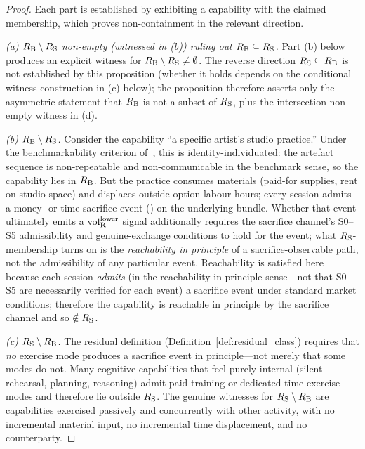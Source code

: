 \begin{proof}
Each part is established by exhibiting a capability with the
claimed membership, which proves non-containment in the relevant
direction.

\emph{(a) $R_{\mathrm{B}} \setminus R_{\mathrm{S}}$ non-empty (witnessed in (b))
ruling out $R_{\mathrm{B}} \subseteq R_{\mathrm{S}}$.}
Part (b) below produces an explicit witness for
$R_{\mathrm{B}} \setminus R_{\mathrm{S}} \neq \emptyset$.  The reverse
direction $R_{\mathrm{S}} \subseteq R_{\mathrm{B}}$ is not established by this
proposition (whether it holds depends on the conditional
witness construction in (c) below); the proposition therefore
asserts only the asymmetric statement that $R_{\mathrm{B}}$ is not a
subset of $R_{\mathrm{S}}$, plus the intersection-non-empty witness in
(d).

\emph{(b) $R_{\mathrm{B}} \setminus R_{\mathrm{S}}$.}
Consider the capability ``a specific artist's studio practice.''
Under the benchmarkability criterion of~\citep[%
Definition~2]{lasser2026poset}, this is identity-individuated: the
artefact sequence is non-repeatable and non-communicable in the
benchmark sense, so the capability lies in $R_{\mathrm{B}}$.  But the
practice consumes materials (paid-for supplies, rent on studio
space) and displaces outside-option labour hours; every session
admits a money- or time-sacrifice event
(\citep[Revealed~Sacrifice]{lasser2026paper8a}) on the underlying bundle.  Whether
that event ultimately emits a ${\operatorname{vol}_{\mathrm{R}}^{\mathrm{lower}}}$ signal additionally
requires the sacrifice channel's S0--S5 admissibility and
genuine-exchange conditions to hold for the event; what
$R_{\mathrm{S}}$-membership turns on is the \emph{reachability in
principle} of a sacrifice-observable path, not the
admissibility of any particular event.  Reachability is
satisfied here because each session
\emph{admits} (in the reachability-in-principle sense---not
that S0--S5 are necessarily verified for each event) a
sacrifice event under standard market conditions; therefore
the capability is reachable in principle by the sacrifice
channel and so $\notin R_{\mathrm{S}}$.

\emph{(c) $R_{\mathrm{S}} \setminus R_{\mathrm{B}}$.}
The residual definition (Definition~\ref{def:residual_class})
requires that \emph{no} exercise mode produces a sacrifice event
in principle---not merely that some modes do not.  Many cognitive
capabilities that feel purely internal (silent rehearsal,
planning, reasoning) admit paid-training or dedicated-time
exercise modes and therefore lie outside $R_{\mathrm{S}}$.  The genuine
witnesses for $R_{\mathrm{S}} \setminus R_{\mathrm{B}}$ are capabilities exercised
passively and concurrently with other activity, with no
incremental material input, no incremental time displacement, and
no counterparty.


\end{proof}

